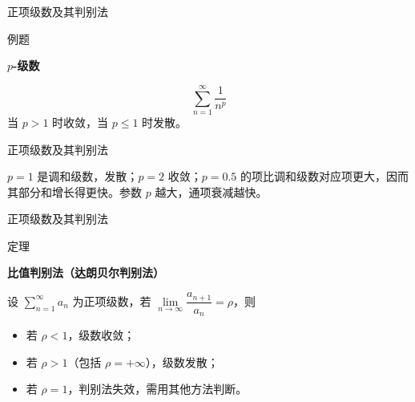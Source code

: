 \documentclass[aspectratio=169,10pt,fontset=fandol]{ctexbeamer}
\newenvironment{custom}[1]{\par\noindent\textbf{#1}\quad}{\par\vspace{0.8em}}
\begin{document}
\begin{frame}[t,fragile]{正项级数及其判别法}
\normalsize
\begin{block}{例题}
{\normalsize
\textbf{\(p\)-级数}\par

\[
\sum_{n=1}^{\infty} \dfrac{1}{n^p}
\]
当 \(p > 1\) 时收敛，当 \(p \leq 1\) 时发散。

}
\end{block}
\end{frame}
\begin{frame}[t,fragile]{正项级数及其判别法}
\normalsize
{\normalsize
\(p=1\) 是调和级数，发散；\(p=2\) 收敛；\(p=0.5\) 的项比调和级数对应项更大，因而其部分和增长得更快。参数 \(p\) 越大，通项衰减越快。

}
\end{frame}
\begin{frame}[t,fragile]{正项级数及其判别法}
\normalsize
\begin{block}{定理}
{\normalsize
\textbf{比值判别法（达朗贝尔判别法）}\par

设 \(\sum\limits_{n = 1}^{  \infty }a_n\) 为正项级数，若 \(\lim\limits_{n\to\infty}\dfrac{a_{n+1}}{a_n}=\rho\)，则
\begin{itemize}
\item 若 \(\rho < 1\)，级数收敛；
\item 若 \(\rho > 1\)（包括 \(\rho = +\infty\)），级数发散；
\item 若 \(\rho = 1\)，判别法失效，需用其他方法判断。
\end{itemize}

}
\end{block}
\end{frame}
\end{document}

